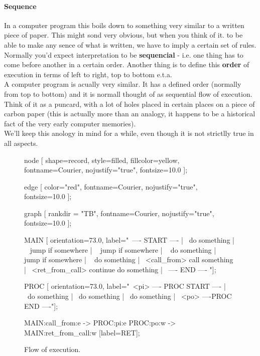 	\paragraph{Sequence}

		In a computer program this boils down to something very similar to a written piece of paper. This might sond very obvious, but when you think of it. to be able to make any sence of what is written, we have to imply a certain set of rules. Normally you'd expect interpretation to be \textbf{sequencial} - i.e. one thing has to come before another in a certain order. Another thing is to define this \textbf{order} of execution in terms of left to right, top to bottom e.t.a.
\\
		A computer program is acually very similar. It has a defined order (normally from top to bottom) and it is normall thought of as sequential flow of execution. Think of it as a puncard, with a lot of holes placed in certain places on a piece of carbon paper (this is actually more than an analogy, it happens to be a historical fact of the very early computer memories).
\\
		We'll keep this anology in mind for a while, even though it is not strictlly true in all aspects.
	\begin{figure}[!hbp]
	\begin{dotpic}
		node [
			shape=record,
			style=filled,
			fillcolor=yellow,
			fontname=Courier,
			nojustify="true",
			fontsize=10.0
		];

		edge [
			color="red",
			fontname=Courier,
			nojustify="true",
			fontsize=10.0
		];

		graph [
			rankdir = "TB",
			fontname=Courier,
			nojustify="true",
			fontsize=10.0
		];

		MAIN [ orientation=73.0, label="{\
			---- START ----         | \
			do something   | \
			<m1> jump if somewhere  | \
			<m2> jump if somewhere   | \
			<m3> do something   | \
			<m4> jump if somewhere   | \
			<m5> do something   | \
			<call_from> call something | \
			<ret_from_call> continue do something | \
			---- END ---- }"];

		PROC [ orientation=73.0, label="{\
			<pi>  ---- PROC START ---- | \
			do something   | \
			do something   | \
			do something   | \      
			<po>  ----PROC END ----}"];


		MAIN:call_from:e -> PROC:pi:e 
		PROC:po:w -> MAIN:ret_from_call:w [label=RET];
	\end{dotpic}
	\caption{Flow of execution.\label{execflow}}	
	\end{figure}

